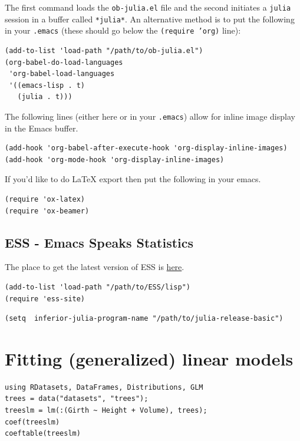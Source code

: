 \documentclass[11pt]{article}
\begin{document}
The first command loads the \texttt{ob-julia.el} file and the second initiates a \texttt{julia} session in a buffer called \texttt{*julia*}.  An alternative method is to put the following in your \texttt{.emacs} (these should go below the \texttt{(require 'org)} line):

\begin{verbatim}
(add-to-list 'load-path "/path/to/ob-julia.el")
(org-babel-do-load-languages
 'org-babel-load-languages
 '((emacs-lisp . t)
   (julia . t)))
\end{verbatim}

The following lines (either here or in your \texttt{.emacs}) allow for inline image display in the Emacs buffer.

\begin{verbatim}
(add-hook 'org-babel-after-execute-hook 'org-display-inline-images)   
(add-hook 'org-mode-hook 'org-display-inline-images)
\end{verbatim}

If you'd like to do \LaTeX{} export then put the following in your emacs.

\begin{verbatim}
(require 'ox-latex)
(require 'ox-beamer)
\end{verbatim}
\subsection[ESS - Emacs Speaks Statistics]{ESS - Emacs Speaks Statistics}
\label{sec-1-4}

The place to get the latest version of ESS is \href{http://stat.ethz.ch/ESS/index.php?Section=download}{here}.  

\begin{verbatim}
(add-to-list 'load-path "/path/to/ESS/lisp")
(require 'ess-site)
\end{verbatim}

\begin{verbatim}
(setq  inferior-julia-program-name "/path/to/julia-release-basic")
\end{verbatim}
\section[Fitting (generalized) linear models]{Fitting (generalized) linear models}
\label{sec-2}

\begin{verbatim}
using RDatasets, DataFrames, Distributions, GLM
trees = data("datasets", "trees");
treeslm = lm(:(Girth ~ Height + Volume), trees);
coef(treeslm)
coeftable(treeslm)
\end{verbatim}
\end{document}

